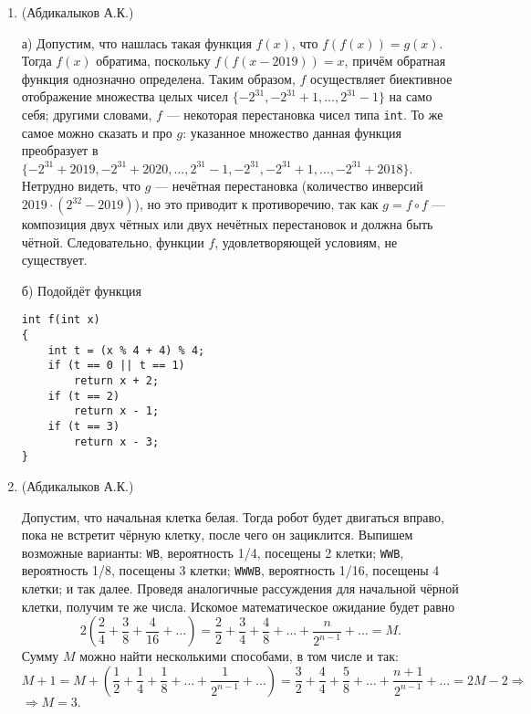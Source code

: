 \documentclass[11pt, a4paper]{article}
\begin{document}
\begin{enumerate}
\newpage

\item (Абдикалыков А.К.) 


а) Допустим, что нашлась такая функция $f(x)$, что $f(f(x))=g(x)$. Тогда $f(x)$ обратима, поскольку $f(f(x - 2019)) = x$, причём обратная функция однозначно определена. Таким образом, $f$ осуществляет биективное отображение множества целых чисел $\{-2^{31}, -2^{31}+1, \hdots, 2^{31}-1\}$ на само себя; другими словами, $f$ --- некоторая перестановка чисел типа {\tt int}. То же самое можно сказать и про $g$: указанное множество данная функция преобразует в $\{-2^{31} + 2019, -2^{31}+2020, \hdots, 2^{31}-1, -2^{31}, -2^{31}+1, \hdots, -2^{31}+2018\}$. Нетрудно видеть, что $g$ --- нечётная перестановка (количество инверсий $2019 \cdot (2^{32} - 2019)$), но это приводит к противоречию, так как $g=f\circ f$ --- композиция двух чётных или двух нечётных перестановок и должна быть чётной. Следовательно, функции $f$, удовлетворяющей условиям, не существует.

б) Подойдёт функция
\begin{verbatim}
int f(int x)
{
    int t = (x % 4 + 4) % 4;
    if (t == 0 || t == 1)
        return x + 2;
    if (t == 2)
        return x - 1;
    if (t == 3)
        return x - 3;
}
\end{verbatim}

\newpage

\item (Абдикалыков А.К.) 

Допустим, что начальная клетка белая. Тогда робот будет двигаться вправо, пока не встретит чёрную клетку, после чего он зациклится. Выпишем возможные варианты: {\tt WB}, вероятность 1/4, посещены 2 клетки; {\tt WWB}, вероятность 1/8, посещены 3 клетки; {\tt WWWB}, вероятность 1/16, посещены 4 клетки; и так далее. Проведя аналогичные рассуждения для начальной чёрной клетки, получим те же числа. Искомое математическое ожидание будет равно
$$
2\left(\frac{2}{4}+\frac{3}{8}+\frac{4}{16}+\hdots\right)=\frac{2}{2}+\frac{3}{4}+\frac{4}{8}+\hdots+\frac{n}{2^{n-1}}+\hdots=M.
$$
Сумму $M$ можно найти несколькими способами, в том числе и так:
$$
M + 1 = M + \left(\frac{1}{2}+\frac{1}{4}+\frac{1}{8}+\hdots+\frac{1}{2^{n-1}}+\hdots\right)=\frac{3}{2}+\frac{4}{4}+\frac{5}{8}+\hdots+\frac{n+1}{2^{n-1}}+\hdots=2M-2 \Rightarrow
$$
$\Rightarrow M = 3.$
\end{enumerate}
\end{document}
